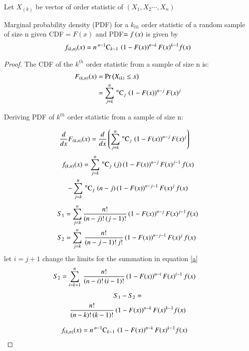 \documentclass[journal,12pt,twocolumn]{IEEEtran}
\begin{document}
\bigskip

Let $X_{(k)}$ be vector of order statistic of $(X_1,X_2\cdots,X_n)$ 
 \begin{lemma}
 Marginal probability density (PDF) for a $k_{th}$ order statistic of a random sample of size n given CDF$=F(x)$ and
 PDF$=f\left(x\right)$ is given by 
 \begin{align}
\nonumber f_{(k,n)}(x) = n\,{}^{n-1}\mathrm{C}_{k-1}\,\left(1-F(x)\right)^{n-k}F(x)^{k-1} f(x)
 \end{align}                                                \label{1}
 \end{lemma}
 
\begin{proof}
 The CDF of the $k^{th}$ order statistic from a sample of size n is:
\begin{align}
\nonumber F_{(k,n)}(x) &= \Pr\left(X_{(k)}\leq x\right) \\
                       &= \displaystyle\sum_{j=k}^{n}\,{}^{n}\mathrm{C}_{j}\,\left(1-F(x)\right)^{n-j} F(x)^{j}
\end{align}
 
Deriving PDF of $k^{th}$ order statistic from a sample of size n:
 
 \begin{align}
\nonumber \dfrac{d}{dx} F_{(k,n)}(x) &= \dfrac{d}{dx}\left(\displaystyle\sum_{j=k}^{n}\,{}^{n}\mathrm{C}_{j}\,\left(1-F(x)\right)^{n-j} F(x)^{j}\right) 
 \end{align}
\begin{multline}
\nonumber f_{(k,n)}(x) = \displaystyle\sum_{j=k}^{n}\,{}^{n}\mathrm{C}_{j}\,\left(j\right)\left(1-F(x)\right)^{n-j}F(x)^{j-1}\,f(x)  \\
                -\displaystyle\sum_{j=k}^{n}\,{}^{n}\mathrm{C}_{j}\,\left(n-j\right)\left(1-F(x)\right)^{n-j-1}F(x)^{j}\,f(x) 
\end{multline}
\begin{align}
S_1  &= \displaystyle\sum_{j=k}^{n} \dfrac{n!}{(n-j)!\,(j-1)!}\left(1-F(x)\right)^{n-j}F(x)^{j-1} f(x) \\
S_2  &= \displaystyle\sum_{j=k}^{n}\,\dfrac{n!}{(n-j-1)!\,j!}\left(1-F(x)\right)^{n-j-1}F(x)^{j}\,f(x) \label{a}
\end{align}
let $i = j+1$ change the limits for the summation in equation \eqref{a}
\begin{align}
\nonumber S_2  &= \displaystyle\sum_{i=k+1}^{n}\,\dfrac{n!}{(n-i)!\,(i-1)!}\left(1-F(x)\right)^{n-i}F(x)^{i-1}\,f(x)  
\end{align}
\begin{multline}
S_1 - S_2  =  \\
           \dfrac{n!}{(n-k)!\,(k-1)!}\left(1-F(x)\right)^{n-k}F(x)^{k-1} f(x) 
\end{multline}

\begin{align}
f_{(k,n)}(x) &= n\,{}^{n-1}\mathrm{C}_{k-1}\,\left(1-F(x)\right)^{n-k}F(x)^{k-1} f(x) \label{b}
\end{align}
\end{proof}
\end{document}
